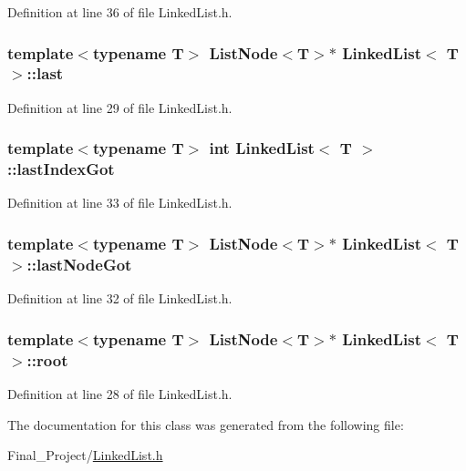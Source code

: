 Definition at line 36 of file Linked\-List.\-h.

\hypertarget{classLinkedList_ae21ffbddc0bed9b6bd7799dba7c7e6c9}{
\subsubsection[{last}]{\setlength{\rightskip}{0pt plus 5cm}template$<$typename T$>$ {\bf List\-Node}$<$T$>$$\ast$ {\bf Linked\-List}$<$ T $>$\-::last\hspace{0.3cm}{\ttfamily [protected]}}}\label{classLinkedList_ae21ffbddc0bed9b6bd7799dba7c7e6c9}


Definition at line 29 of file Linked\-List.\-h.

\hypertarget{classLinkedList_a29bcd5966f3e88990007d76c122e22e3}{
\subsubsection[{last\-Index\-Got}]{\setlength{\rightskip}{0pt plus 5cm}template$<$typename T$>$ int {\bf Linked\-List}$<$ T $>$\-::last\-Index\-Got\hspace{0.3cm}{\ttfamily [protected]}}}\label{classLinkedList_a29bcd5966f3e88990007d76c122e22e3}


Definition at line 33 of file Linked\-List.\-h.

\hypertarget{classLinkedList_aff769fff999bc5524dac82fa328f2bd8}{
\subsubsection[{last\-Node\-Got}]{\setlength{\rightskip}{0pt plus 5cm}template$<$typename T$>$ {\bf List\-Node}$<$T$>$$\ast$ {\bf Linked\-List}$<$ T $>$\-::last\-Node\-Got\hspace{0.3cm}{\ttfamily [protected]}}}\label{classLinkedList_aff769fff999bc5524dac82fa328f2bd8}


Definition at line 32 of file Linked\-List.\-h.

\hypertarget{classLinkedList_ae5e0a92c9b9b936a49a4e40a121a2b31}{
\subsubsection[{root}]{\setlength{\rightskip}{0pt plus 5cm}template$<$typename T$>$ {\bf List\-Node}$<$T$>$$\ast$ {\bf Linked\-List}$<$ T $>$\-::root\hspace{0.3cm}{\ttfamily [protected]}}}\label{classLinkedList_ae5e0a92c9b9b936a49a4e40a121a2b31}


Definition at line 28 of file Linked\-List.\-h.



The documentation for this class was generated from the following file\-:\begin{DoxyCompactItemize}
\item 
Final\-\_\-\-Project/\hyperlink{LinkedList_8h}{Linked\-List.\-h}\end{DoxyCompactItemize}
